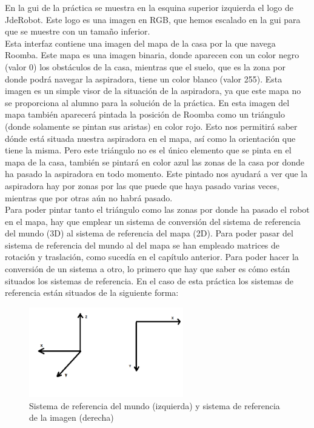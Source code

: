 En la \acrshort{gui} de la práctica se muestra en la esquina superior izquierda el logo de JdeRobot. Este logo es una imagen en RGB, que hemos escalado en la \acrshort{gui} para que se muestre con un tamaño inferior.\\

Esta interfaz contiene una imagen del mapa de la casa por la que navega Roomba. Este mapa es una imagen binaria, donde aparecen con un color negro (valor 0) los obstáculos de la casa, mientras que el suelo, que es la zona por donde podrá navegar la aspiradora, tiene un color blanco (valor 255). Esta imagen es un simple visor de la situación de la aspiradora, ya que este mapa no se proporciona al alumno para la solución de la práctica. En esta imagen del mapa también aparecerá pintada la posición de Roomba como un triángulo (donde solamente se pintan sus aristas) en color rojo. Esto nos permitirá saber dónde está situada nuestra aspiradora en el mapa, así como la orientación que tiene la misma. Pero este triángulo no es el único elemento que se pinta en el mapa de la casa, también se pintará en color azul las zonas de la casa por donde ha pasado la aspiradora en todo momento. Este pintado nos ayudará a ver que la aspiradora hay por zonas por las que puede que haya pasado varias veces, mientras que por otras aún no habrá pasado.\\

Para poder pintar tanto el triángulo como las zonas por donde ha pasado el robot en el mapa, hay que emplear un sistema de conversión del sistema de referencia del mundo (3D) al sistema de referencia del mapa (2D). Para poder pasar del sistema de referencia del mundo al del mapa se han empleado matrices de rotación y traslación, como sucedía en el capítulo anterior. Para poder hacer la conversión de un sistema a otro, lo primero que hay que saber es cómo están situados los sistemas de referencia. En el caso de esta práctica los sistemas de referencia están situados de la siguiente forma:

\begin{figure}[H]
  \begin{center}
    \includegraphics[width=0.6\textwidth]{figures/Vacuum/SistemaRef_world_image.png}
		\caption{Sistema de referencia del mundo (izquierda) y sistema de referencia de la imagen (derecha)}
		\label{fig.sistemaref_world}
		\end{center}
\end{figure}

